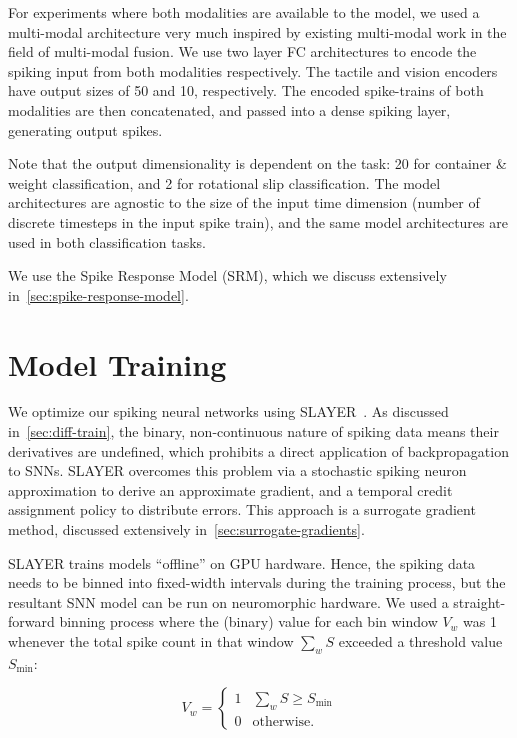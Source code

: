 \documentclass[fyp]{socreport}
\begin{document}
For experiments where both modalities are available to the model, we used a
multi-modal architecture very much inspired by existing multi-modal work in
the field of multi-modal fusion. We use two layer FC architectures to encode the
spiking input from both modalities respectively. The tactile and vision encoders
have output sizes of 50 and 10, respectively. The encoded spike-trains of both
modalities are then concatenated, and passed into a dense spiking layer,
generating output spikes.

Note that the output dimensionality is dependent on the task: 20 for container \&
weight classification, and 2 for rotational slip classification. The model
architectures are agnostic to the size of the input time dimension (number of
discrete timesteps in the input spike train), and the same model architectures
are used in both classification tasks.

We use the Spike Response Model (SRM), which we discuss extensively
in~\autoref{sec:spike-response-model}.

\section{Model Training\label{sec:model-training}}

We optimize our spiking neural networks using SLAYER~\cite{NIPS2018_7415}. As
discussed in~\autoref{sec:diff-train}, the binary, non-continuous nature of
spiking data means their derivatives are undefined, which prohibits a direct
application of backpropagation to SNNs. SLAYER overcomes this problem via a
stochastic spiking neuron approximation to derive an approximate gradient, and a
temporal credit assignment policy to distribute errors. This approach is a
surrogate gradient method, discussed extensively
in~\autoref{sec:surrogate-gradients}.

SLAYER trains models ``offline'' on GPU hardware. Hence, the spiking data needs
to be binned into fixed-width intervals during the training process, but the
resultant SNN model can be run on neuromorphic hardware. We used a
straight-forward binning process where the (binary) value for each bin window
$V_{w}$ was 1 whenever the total spike count in that window $\sum_{w} S$
exceeded a threshold value $S_{\text{min}}$:

\begin{equation} \label{eqn:bin}
  V_w = \begin{cases}
    1 & \sum_{w} S \ge S_\text{min} \\
    0 & \text{otherwise.}
  \end{cases}
\end{equation}
\end{document}
